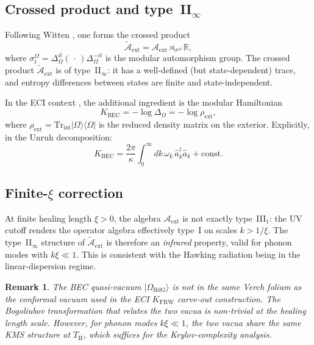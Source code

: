 \documentclass[12pt,a4paper]{article}
\newtheorem{remark}{Remark}
\renewcommand{\TH}{T_{\mathrm{H}}}
\begin{document}
\subsection{Crossed product and type~II$_\infty$}

Following Witten \cite{witten2022}, one forms the crossed product
\begin{equation}
  \widetilde{\mathcal{A}}_{\mathrm{ext}}
    = \mathcal{A}_{\mathrm{ext}} \rtimes_{\sigma^\Omega} \mathbb{R},
\end{equation}
where $\sigma^\Omega_t = \Delta_\Omega^{it}(\,\cdot\,)\Delta_\Omega^{-it}$
is the modular automorphism group.
The crossed product $\widetilde{\mathcal{A}}_{\mathrm{ext}}$ is of
type~II$_\infty$: it has a well-defined (but state-dependent) trace, and
entropy differences between states are finite and state-independent.

In the ECI context \cite{eci_krylov_diameter}, the additional ingredient
is the modular Hamiltonian
\begin{equation}
  K_{\mathrm{BEC}} = -\log\Delta_\Omega
    = -\log\rho_{\mathrm{ext}},
\end{equation}
where $\rho_{\mathrm{ext}} = \mathrm{Tr}_{\mathrm{int}}|\Omega\rangle\langle\Omega|$
is the reduced density matrix on the exterior.
Explicitly, in the Unruh decomposition:
\begin{equation}
  K_{\mathrm{BEC}} = \frac{2\pi}{\kappa}
    \int_0^\infty dk\,\omega_k\,\hat{a}_k^\dagger \hat{a}_k + \text{const.}
\end{equation}

\subsection{Finite-$\xi$ correction}

At finite healing length $\xi > 0$, the algebra $\mathcal{A}_{\mathrm{ext}}$
is not exactly type~III$_1$: the UV cutoff renders the operator algebra
effectively type~I on scales $k > 1/\xi$.
The type~II$_\infty$ structure of $\widetilde{\mathcal{A}}_{\mathrm{ext}}$
is therefore an \emph{infrared} property, valid for phonon modes with
$k \xi \ll 1$.
This is consistent with the Hawking radiation being in the linear-dispersion
regime.

\begin{remark}
The BEC quasi-vacuum $|\Omega_{\mathrm{BdG}}\rangle$ is \emph{not} in the
same Verch folium as the conformal vacuum used in the ECI $K_{\mathrm{FRW}}$
carve-out construction.
The Bogoliubov transformation that relates the two vacua is non-trivial at
the healing length scale.
However, for phonon modes $k\xi \ll 1$, the two vacua share the same
KMS structure at $\TH$, which suffices for the Krylov-complexity analysis.
\end{remark}
\end{document}
